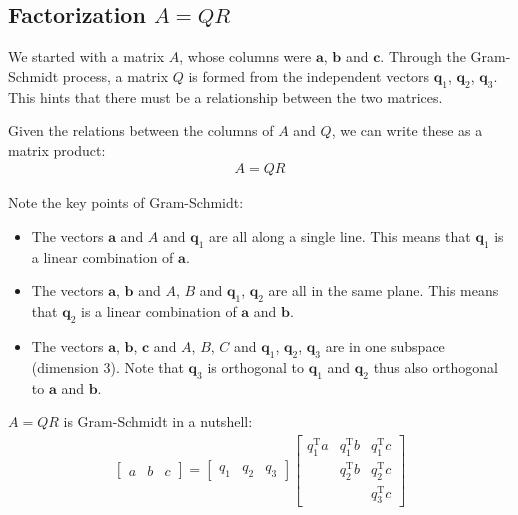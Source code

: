 \documentclass[10pt,a4paper]{article}
\begin{document}
\pagebreak

\subsection{Factorization $A = QR$}

We started with a matrix $A$,  whose columns  were  $\textbf{a}$, $\textbf{b}$ and $\textbf{c}$.
Through the Gram-Schmidt process, a matrix $Q$ is formed from the independent vectors
$\textbf{q}_1$, $\textbf{q}_2$, $\textbf{q}_3$. This hints that there must be a relationship between
the two matrices.

Given the relations between the columns of $A$ and $Q$, we can write these as a matrix product:
\begin{align*}
    A = QR
\end{align*}

Note the key points of Gram-Schmidt:
\begin{itemize}
    \item The vectors $\textbf{a}$ and $A$ and $\textbf{q}_1$ are all along a single line. This
    means that $\textbf{q}_1$ is a linear combination of $\textbf{a}$.
    \item The vectors $\textbf{a}$, $\textbf{b}$ and $A$, $B$ and $\textbf{q}_1$, $\textbf{q}_2$ are
    all in the same plane. This means that $\textbf{q}_2$ is a linear combination of $\textbf{a}$ and $\textbf{b}$.
    \item The vectors $\textbf{a}$, $\textbf{b}$, $\textbf{c}$ and $A$, $B$, $C$ and $\textbf{q}_1$,
    $\textbf{q}_2$, $\textbf{q}_3$ are in one subspace (dimension 3). Note that $\textbf{q}_3$ is
    orthogonal to $\textbf{q}_1$ and $\textbf{q}_2$ thus also orthogonal to $\textbf{a}$ and $\textbf{b}$.
\end{itemize} 

$A = QR$ is Gram-Schmidt in a nutshell:
\begin{align*}
    \left[\begin{array}{lll}
        a & b & c
        \end{array}\right]=\left[\begin{array}{lll}
        q_{1} & q_{2} & q_{3}
        \end{array}\right]\left[\begin{array}{lll}
        q_{1}^{\mathrm{T}} a & q_{1}^{\mathrm{T}} b & q_{1}^{\mathrm{T}} c \\
        & q_{2}^{\mathrm{T}} b & q_{2}^{\mathrm{T}} c \\
        & & q_{3}^{\mathrm{T}} c
        \end{array}\right]
\end{align*}
\end{document}
